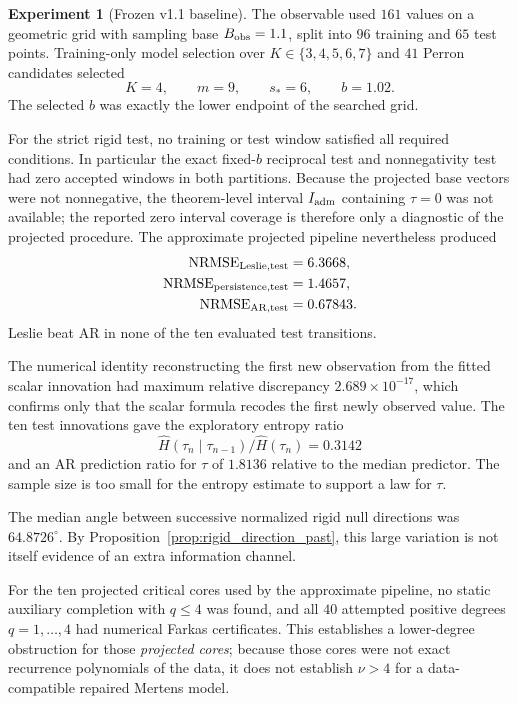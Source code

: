 \documentclass[11pt]{amsart}
\numberwithin{equation}{section}
\theoremstyle{plain}
\theoremstyle{definition}
\newtheorem{experiment}[theorem]{Experiment}
\theoremstyle{remark}
\begin{document}
\begin{experiment}[Frozen v1.1 baseline]
\label{exp:v11_baseline}
The observable used $161$ values on a geometric grid with sampling base $B_{\rm obs}=1.1$, split into $96$ training and $65$ test points. Training-only model selection over $K\in\{3,4,5,6,7\}$ and $41$ Perron candidates selected
\begin{equation}K=4,\qquad m=9,\qquad s_*=6,\qquad b=1.02.\label{eq:v11_selected_model}\end{equation}
The selected $b$ was exactly the lower endpoint of the searched grid.

For the strict rigid test, no training or test window satisfied all required conditions. In particular the exact fixed-$b$ reciprocal test and nonnegativity test had zero accepted windows in both partitions. Because the projected base vectors were not nonnegative, the theorem-level interval $I_{\rm adm}$ containing $\tau=0$ was not available; the reported zero interval coverage is therefore only a diagnostic of the projected procedure. The approximate projected pipeline nevertheless produced
\begin{align}
\operatorname{NRMSE}_{\rm Leslie,test}&=6.3668,\\
\operatorname{NRMSE}_{\rm persistence,test}&=1.4657,\\
\operatorname{NRMSE}_{\rm AR,test}&=0.67843.
\label{eq:v11_errors}
\end{align}
Leslie beat AR in none of the ten evaluated test transitions.

The numerical identity reconstructing the first new observation from the fitted scalar innovation had maximum relative discrepancy $2.689\times10^{-17}$, which confirms only that the scalar formula recodes the first newly observed value. The ten test innovations gave the exploratory entropy ratio
\begin{equation}\widehat H(\tau_n\mid\tau_{n-1})/\widehat H(\tau_n)=0.3142\label{eq:v11_entropy_ratio}\end{equation}
and an AR prediction ratio for $\tau$ of $1.8136$ relative to the median predictor. The sample size is too small for the entropy estimate to support a law for $\tau$.

The median angle between successive normalized rigid null directions was $64.8726^\circ$. By Proposition~\ref{prop:rigid_direction_past}, this large variation is not itself evidence of an extra information channel.

For the ten projected critical cores used by the approximate pipeline, no static auxiliary completion with $q\leq4$ was found, and all $40$ attempted positive degrees $q=1,\ldots,4$ had numerical Farkas certificates. This establishes a lower-degree obstruction for those \emph{projected cores}; because those cores were not exact recurrence polynomials of the data, it does not establish $\nu>4$ for a data-compatible repaired Mertens model.


\end{experiment}
\end{document}

